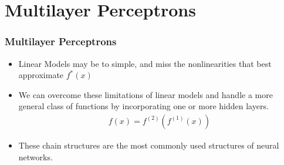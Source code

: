 \documentclass[
  shownotes,
  xcolor={svgnames},
  hyperref={colorlinks,citecolor=DarkBlue,linkcolor=DarkRed,urlcolor=DarkBlue}
  , aspectratio=169]{beamer}
\begin{document}
\section{Multilayer Perceptrons}
\begin{frame}
\frametitle{Multilayer Perceptrons}

\begin{itemize}
    \item Linear Models may be to simple, and miss the nonlinearities that best approximate $f^*(x)$
    \medskip
    \item We can overcome these limitations of linear models and handle a more general class of functions by incorporating one or more hidden layers.
    \medskip
    \begin{align}
    f(x)=f^{(2)}(f^{(1)}(x))
    \end{align}
     \medskip
 \item These chain structures are the most commonly used structures of neural networks. 
\end{itemize}
\end{frame}
\end{document}
